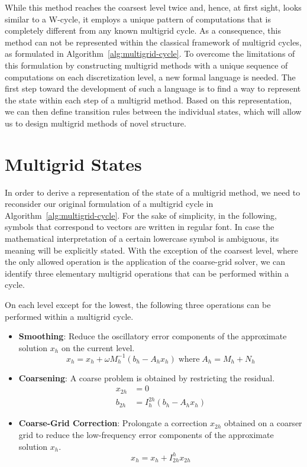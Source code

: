 While this method reaches the coarsest level twice and, hence, at first sight, looks similar to a W-cycle, it employs a unique pattern of computations that is completely different from any known multigrid cycle.
As a consequence, this method can not be represented within the classical framework of multigrid cycles, as formulated in Algorithm~\ref{alg:multigrid-cycle}.
To overcome the limitations of this formulation by constructing multigrid methods with a unique sequence of computations on each discretization level, a new formal language is needed.
The first step toward the development of such a language is to find a way to represent the state within each step of a multigrid method.
Based on this representation, we can then define transition rules between the individual states, which will allow us to design multigrid methods of novel structure.
\section{Multigrid States}
\label{sec:multigrid-states}
In order to derive a representation of the state of a multigrid method, we need to reconsider our original formulation of a multigrid cycle in Algorithm~\ref{alg:multigrid-cycle}.
For the sake of simplicity, in the following, symbols that correspond to vectors are written in regular font.
In case the mathematical interpretation of a certain lowercase symbol is ambiguous, its meaning will be explicitly stated. 
With the exception of the coarsest level, where the only allowed operation is the application of the coarse-grid solver, we can identify three elementary multigrid operations that can be performed within a cycle.
\begin{definition}
\label{def:elementary-multigrid-operations}
On each level except for the lowest, the following three operations can be performed within a multigrid cycle.
\begin{itemize}
	\item \textbf{Smoothing}: Reduce the oscillatory error components of the approximate solution $x_h$ on the current level. 
	\begin{equation}
		x_h = x_h + \omega M_h^{-1} \left( b_h - A_h x_h \right) \; \text{where} \; A_h = M_h + N_h
	\end{equation}
	\item \textbf{Coarsening}: A coarse problem is obtained by restricting the residual.
	\begin{equation}
    \begin{split}
     	x_{2h} & = 0 \\
		b_{2h} & = I_h^{2h} (b_h - A_h x_h)
    \end{split}
	\end{equation}
	\item \textbf{Coarse-Grid Correction}: Prolongate a correction $x_{2h}$ obtained on a coarser grid to reduce the low-frequency error components of the approximate solution $x_h$.
	\begin{equation}
		x_h = x_h + I_{2h}^h x_{2h}
	\end{equation}
\end{itemize}
\end{definition}
